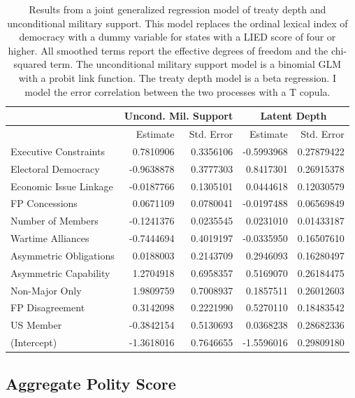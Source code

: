 \documentclass[12pt]{article}
\begin{document}
\begin{table}[ht]
\centering
\begin{tabular}{lrrrr}
  & \multicolumn{2}{c}{Uncond. Mil. Support} & \multicolumn{2}{c}{Latent Depth}\\ \hline
 & Estimate & Std. Error & Estimate & Std. Error \\ 
  \hline
  Executive Constraints & 0.7810906 & 0.3356106 & -0.5993968 & 0.27879422 \\ 
  Electoral Democracy & -0.9638878 & 0.3777303 & 0.8417301 & 0.26915378 \\ 
  Economic Issue Linkage & -0.0187766 & 0.1305101 & 0.0444618 & 0.12030579 \\ 
  FP Concessions & 0.0671109 & 0.0780041 & -0.0197488 & 0.06569849 \\ 
  Number of Members & -0.1241376 & 0.0235545 & 0.0231010 & 0.01433187 \\ 
  Wartime Alliances & -0.7444694 & 0.4019197 & -0.0335950 & 0.16507610 \\ 
  Asymmetric Obligations & 0.0188003 & 0.2143709 & 0.2946093 & 0.16280497 \\ 
  Asymmetric Capability & 1.2704918 & 0.6958357 & 0.5169070 & 0.26184475 \\ 
  Non-Major Only & 1.9809759 & 0.7008937 & 0.1857511 & 0.26012603 \\ 
  FP Disagreement & 0.3142098 & 0.2221990 & 0.5270110 & 0.18483542 \\ 
  US Member & -0.3842154 & 0.5130693 & 0.0368238 & 0.28682336 \\ 
  (Intercept) & -1.3618016 & 0.7646655 & -1.5596016 & 0.29809180 \\ 
   \hline
\end{tabular}
\caption{Results from a joint generalized regression model of treaty depth and unconditional military support. 
                     This model replaces the ordinal lexical index of democracy with a dummy variable for states with a LIED score of four or higher.
                     All smoothed terms report the effective degrees of freedom and the chi-squared term. 
                     The unconditional military support model is a binomial GLM with a probit link function. 
                     The treaty depth model is a beta regression. 
                     I model the error correlation between the two processes with a T copula.} 
\label{tab:gjrm-res-lih}
\end{table}



\subsection{Aggregate Polity Score}
\end{document}

